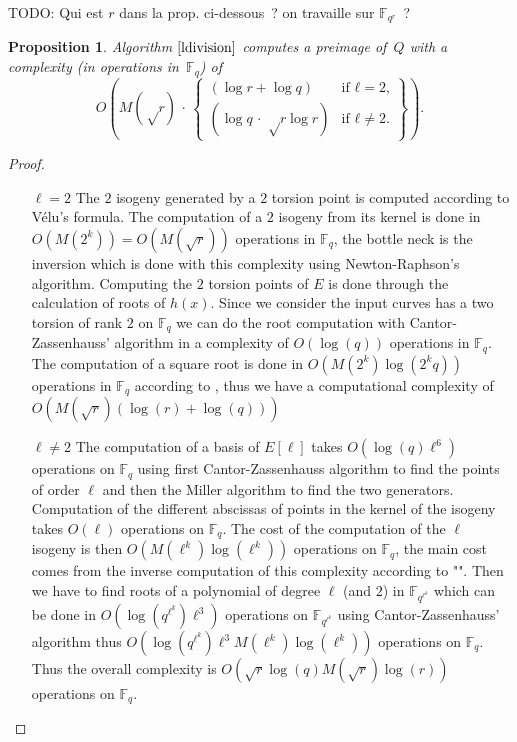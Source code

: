 \documentclass{lms}
\newcommand{\todo}[1]{{\color{red}TODO: #1}}
\newtheorem{prop}[thm]{Proposition}
\def\pa#1{\left(#1\right)}
\begin{document}
\todo{Qui est $r$ dans la prop. ci-dessous ? on travaille sur $\mathbb
F_{q^r}$ ?}
\begin{prop}
Algorithm $\ref{ldivision}$ computes a preimage of~$Q$ with a complexity
(in operations in~$\mathbb{F}_q$) of
\[
O \pa{M(√r) \,· \,\left\lbrace\begin{array}{ll}
 (\log r + \log q) & \text{if $ℓ = 2$,} \\
 (\log q \,·\, √{r} \log r) & \text{if $ℓ ≠ 2$.}
\end{array}\right\rbrace}.
\]
 
\end{prop}

\begin{proof}
\begin{enumerate}
\item[$\ell = 2$]
The $2$ isogeny generated by a $2$ torsion point is computed according to Vélu's formula.
The computation of a $2$ isogeny from its kernel is done in $O(M(2^k))=O(M(\sqrt{r}))$ operations in $\mathbb{F}_q$, the bottle neck is the inversion which is done with this complexity using Newton-Raphson's algorithm.
\newline
Computing the $2$ torsion points of $E$ is done through the calculation of roots of $h(x)$.
Since we consider the input curves has a two torsion of rank $2$ on $\mathbb{F}_q$ we can do the root computation with Cantor-Zassenhauss' algorithm in a complexity of $O( \log(q))$ operations in $\mathbb{F}_q$. 
The computation of a square root is done in $O(M(2^k)\log(2^kq))$ operations in $\mathbb{F}_q$ according to \cite{DBLP:journals/dcc/DoliskaniS15}, thus we have a computational complexity of $O(M(\sqrt{r})(\log(r)+\log(q)))$
\item[$\ell \neq 2$]The computation of a basis of $E[\ell]$ takes $O(\log(q)\ell^6 )$ operations on $\mathbb{F}_q$ using first Cantor-Zassenhauss algorithm to find the points of order $\ell$ and then the Miller algorithm to find  the two generators. Computation of the different abscissas of points in the kernel of the isogeny takes $O(\ell )$ operations on $\mathbb{F}_q$. The cost of the computation of the $\ell$ isogeny is then $O(M(\ell^k)\log(\ell^k))$ operations on $\mathbb{F}_{q}$, the main cost comes from the inverse computation of this complexity according to "\cite{DeDoSc13}". Then we have to find roots of a polynomial of degree $\ell$ (and $2$) in $\mathbb{F}_{q^{\ell^k}}$ which can be done in $O(\log(q^{\ell^k})\ell^3)$ operations on $\mathbb{F}_{q^{\ell^k}}$ using Cantor-Zassenhauss' algorithm thus $O(\log(q^{\ell^k})\ell^3 M(\ell^k)\log(\ell^k))$ operations on $\mathbb{F}_q$. Thus the overall complexity is $O(\sqrt{r} \log(q) M(\sqrt{r})\log(r))$ operations on $\mathbb{F}_q$.
\end{enumerate}
\end{proof}
\end{document}

